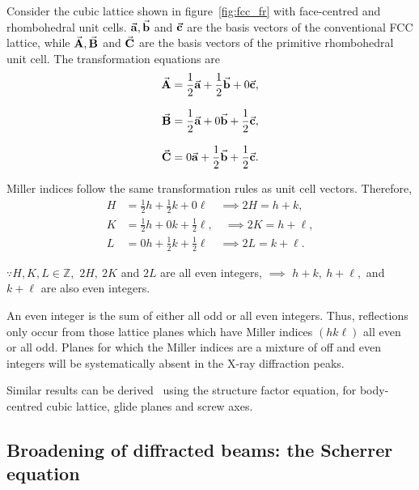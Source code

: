 	Consider the cubic lattice shown in figure~\ref{fig:fcc_fr} with face-centred and rhombohedral unit cells. $\va{a}, \va{b}$ and $\va{c}$ are the basis vectors of the conventional FCC lattice, while $\va{A}, \va{B}$ and $\va{C}$ are the basis vectors of the primitive rhombohedral unit cell. The transformation equations are%
%		
	\begin{subequations}%
		\begin{align}
		\va{A} &= \frac{1}{2}\va{a} + \frac{1}{2}\va{b} + 0\va{c},\\[0.8em]
		\va{B} &= \frac{1}{2}\va{a} + 0\va{b} + \frac{1}{2}\va{c},\\[0.8em]
		\va{C} &= 0\va{a} + \frac{1}{2}\va{b} + \frac{1}{2}\va{c}.
		\end{align}
	\end{subequations}
	
	Miller indices follow the same transformation rules as unit cell vectors. Therefore,%
%	
	\begin{subequations}%
		\begin{align}
		H &= \frac{1}{2}h + \frac{1}{2}k + 0\ell \quad \implies 2H = h + k,\\[0.8em]
		K &= \frac{1}{2}h + 0k + \frac{1}{2}\ell, \quad \implies 2K = h + \ell,\\[0.8em]
		L &= 0h + \frac{1}{2}k + \frac{1}{2}\ell \quad \implies 2L = k + \ell.
		\end{align}
	\end{subequations}
	
	$\because H,K,L \in \mathbb{Z},$  $2H,\ 2K$ and $2L$ are all even integers, $\implies$ $h + k,\ h + \ell,$ and $k + \ell$ are also even integers.
	
	An even integer is the sum of either all odd or all even integers. Thus, reflections only occur from those lattice planes which have Miller indices $(hk\ell)$ all even or all odd. Planes for which the Miller indices are a mixture of off and even integers will be systematically absent in the X-ray diffraction peaks.
	
	Similar results can be derived~\cite{Hammond2015} using the structure factor equation, for body-centred cubic lattice, glide planes and screw axes.
	

\subsection{Broadening of diffracted beams: the Scherrer equation}
	
